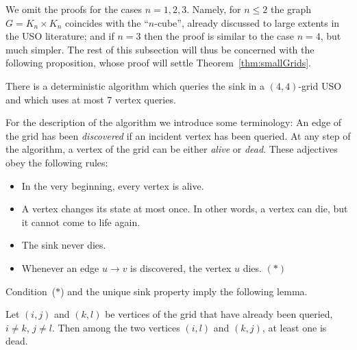 \documentclass[runningheads,a4paper]{llncs}
\begin{document}
We omit the proofs for the cases $n = 1,2,3$.
Namely, for $n \le 2$ the graph $G = K_n \times K_n$ coincides with the
``$n$-cube'', already discussed to large extents in the USO literature;
and if $n = 3$ then the proof is similar to the case $n=4$, but much simpler.
The rest of this subsection will thus be concerned with the following
proposition, whose proof will settle Theorem~\ref{thm:smallGrids}.

\begin{proposition}
    \label{prop:4:7}
    There is a deterministic algorithm which queries the sink in a
    $(4,4)$-grid USO and which uses at most 7 vertex queries.
\end{proposition}

For the description of the algorithm we introduce some terminology:
An edge of the grid has been \emph{discovered} if an incident vertex has been
queried.
At any step of the algorithm, a vertex of the grid can be either \emph{alive}
or \emph{dead}.
These adjectives obey the following rules:
\begin{itemize}
    \item
        In the very beginning, every vertex is alive.

    \item
        A vertex changes its state at most once.
        In other words, a vertex can die, but it cannot come to life again.

    \item
        The sink never dies.

    \item
        Whenever an edge $u \to v$ is discovered, the vertex $u$ dies.
        \hfill $(*)$
\end{itemize}

Condition~($*$) and the unique sink property imply the following lemma.

\begin{lemma}
    Let $(i,j)$ and $(k,l)$ be vertices of the grid that have already been
    queried, $i \neq k$, $j \neq l$.
    Then among the two vertices $(i,l)$ and $(k,j)$, at least one is dead.

    \label{lem:rectangle}
\end{lemma}
\end{document}
